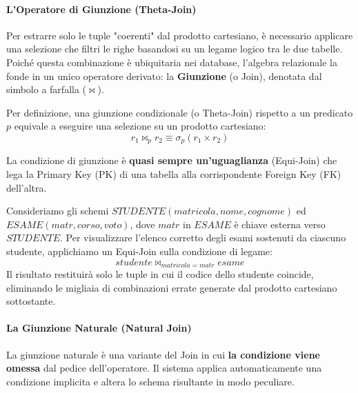 \paragraph{L'Operatore di Giunzione (Theta-Join)}

Per estrarre solo le tuple "coerenti" dal prodotto cartesiano, è necessario applicare una selezione che filtri le righe basandosi su un legame logico tra le due tabelle. Poiché questa combinazione è ubiquitaria nei database, l'algebra relazionale la fonde in un unico operatore derivato: la \textbf{Giunzione} (o Join), denotata dal simbolo a farfalla ($\bowtie$).

Per definizione, una giunzione condizionale (o Theta-Join) rispetto a un predicato $p$ equivale a eseguire una selezione su un prodotto cartesiano:
$$ r_1 \bowtie_p r_2 \equiv \sigma_p(r_1 \times r_2) $$

La condizione di giunzione è \textbf{quasi sempre un'uguaglianza} (Equi-Join) che lega la Primary Key (PK) di una tabella alla corrispondente Foreign Key (FK) dell'altra.

\begin{example}
    Consideriamo gli schemi $STUDENTE(matricola, nome, cognome)$ ed $ESAME(matr, corso, voto)$, dove $matr$ in $ESAME$ è chiave esterna verso $STUDENTE$.
    Per visualizzare l'elenco corretto degli esami sostenuti da ciascuno studente, applichiamo un Equi-Join sulla condizione di legame:
    $$ studente \bowtie_{matricola = matr} esame $$
    Il risultato restituirà solo le tuple in cui il codice dello studente coincide, eliminando le migliaia di combinazioni errate generate dal prodotto cartesiano sottostante.
\end{example}

\paragraph{La Giunzione Naturale (Natural Join)}

La giunzione naturale è una variante del Join in cui \textbf{la condizione viene omessa} dal pedice dell'operatore. Il sistema applica automaticamente una condizione implicita e altera lo schema risultante in modo peculiare.

